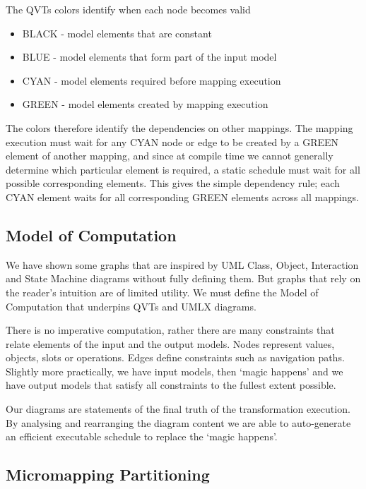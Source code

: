 \documentclass{llncs}
\begin{document}
The QVTs colors identify when each node becomes valid 
\begin{itemize}
	\item BLACK - model elements that are constant
	\item BLUE - model elements that form part of the input model
	\item CYAN - model elements required before mapping execution
	\item GREEN - model elements created by mapping execution
\end{itemize}

The colors therefore identify the dependencies on other mappings. The mapping execution must wait for any CYAN node or edge to be created by a GREEN element of another mapping, and since at compile time we cannot generally determine which particular element is required, a static schedule must wait for all possible corresponding elements. This gives the simple dependency rule; each CYAN element waits for all corresponding GREEN elements across all mappings.

\subsection{Model of Computation}

We have shown some graphs that are inspired by UML Class, Object, Interaction and State Machine diagrams without fully defining them. But graphs that rely on the reader's intuition are of limited utility. We must define the Model of Computation \cite{moc} that underpins QVTs and UMLX diagrams. 

There is no imperative computation, rather there are many constraints that relate elements of the input and the output models. Nodes represent values, objects, slots or operations. Edges define constraints such as navigation paths. Slightly more practically, we have input models, then `magic happens' and we have output models that satisfy all constraints to the fullest extent possible.

Our diagrams are statements of the final truth of the transformation execution. By analysing and rearranging the diagram content we are able to auto-generate an efficient executable schedule to replace the `magic happens'.

\subsection{Micromapping Partitioning}
\end{document}
